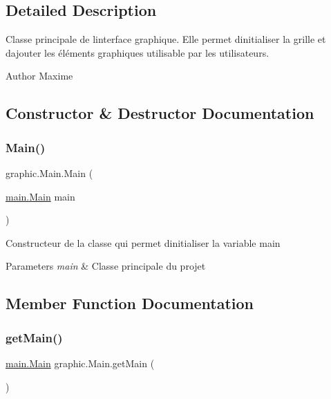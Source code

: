 \subsection{Detailed Description}
Classe principale de l\textquotesingle{}interface graphique. Elle permet d\textquotesingle{}initialiser la grille et d\textquotesingle{}ajouter les éléments graphiques utilisable par les utilisateurs. \begin{DoxyAuthor}{Author}
Maxime 
\end{DoxyAuthor}


\subsection{Constructor \& Destructor Documentation}
\hypertarget{classgraphic_1_1_main_accc0905da50b389894edb0d06c74d729}{}\label{classgraphic_1_1_main_accc0905da50b389894edb0d06c74d729} 
\subsubsection{\texorpdfstring{Main()}{Main()}}
{\footnotesize\ttfamily graphic.\+Main.\+Main (\begin{DoxyParamCaption}\item[{\hyperlink{classmain_1_1_main}{main.\+Main}}]{main }\end{DoxyParamCaption})}

Constructeur de la classe qui permet d\textquotesingle{}initialiser la variable main 
\begin{DoxyParams}{Parameters}
{\em main} & Classe principale du projet \\
\hline
\end{DoxyParams}


\subsection{Member Function Documentation}
\hypertarget{classgraphic_1_1_main_a301b089a02920c585b50d06ff024b145}{}\label{classgraphic_1_1_main_a301b089a02920c585b50d06ff024b145} 
\subsubsection{\texorpdfstring{get\+Main()}{getMain()}}
{\footnotesize\ttfamily \hyperlink{classmain_1_1_main}{main.\+Main} graphic.\+Main.\+get\+Main (\begin{DoxyParamCaption}{ }\end{DoxyParamCaption})}

